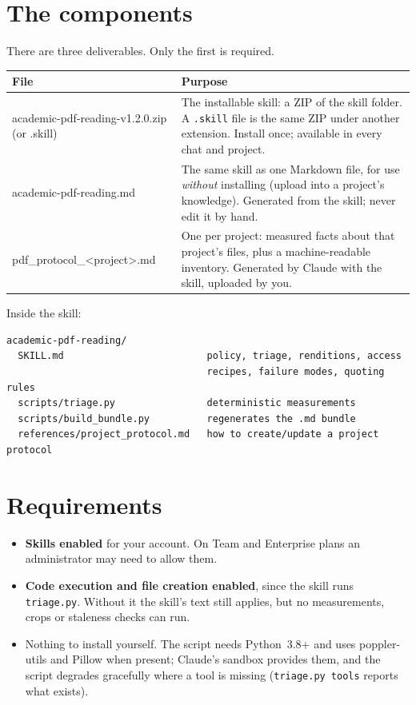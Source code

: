 \documentclass[11pt,a4paper]{article}
\newcommand{\file}[1]{\texttt{#1}}
\newcommand{\cmd}[1]{\texttt{#1}}
\begin{document}
\section{The components}

There are three deliverables. Only the first is required.

\begin{center}
\begin{tabularx}{\linewidth}{@{}>{\ttfamily}p{5.4cm}X@{}}
\toprule
\normalfont\textbf{File} & \textbf{Purpose} \\
\midrule
academic-pdf-reading-\allowbreak v1.2.0.zip (or .skill) & The installable skill: a ZIP
of the skill folder. A \file{.skill} file is the same ZIP under another
extension. Install once; available in every chat and project. \\
academic-pdf-reading.md & The same skill as one Markdown file, for use
\emph{without} installing (upload into a project's knowledge). Generated
from the skill; never edit it by hand. \\
pdf\_protocol\_<project>.md & One per project: measured facts about that
project's files, plus a machine-readable inventory. Generated by Claude
with the skill, uploaded by you. \\
\bottomrule
\end{tabularx}
\end{center}

Inside the skill:

\begin{lstlisting}
academic-pdf-reading/
  SKILL.md                         policy, triage, renditions, access
                                   recipes, failure modes, quoting rules
  scripts/triage.py                deterministic measurements
  scripts/build_bundle.py          regenerates the .md bundle
  references/project_protocol.md   how to create/update a project protocol
\end{lstlisting}

\section{Requirements}

\begin{itemize}
  \item \textbf{Skills enabled} for your account. On Team and Enterprise
  plans an administrator may need to allow them.
  \item \textbf{Code execution and file creation enabled}, since the skill
  runs \file{triage.py}. Without it the skill's text still applies, but no
  measurements, crops or staleness checks can run.
  \item Nothing to install yourself. The script needs Python~3.8+ and uses
  poppler-utils and Pillow when present; Claude's sandbox provides them, and
  the script degrades gracefully where a tool is missing
  (\cmd{triage.py tools} reports what exists).
\end{itemize}
\end{document}
